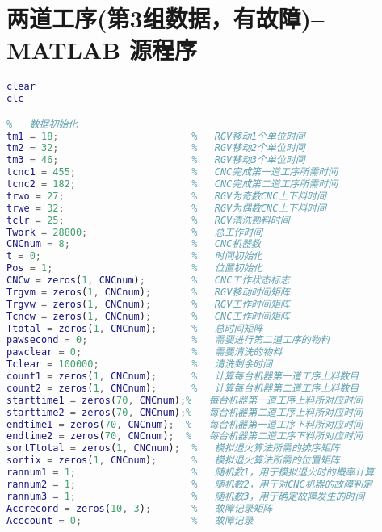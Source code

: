 \documentclass[no-math,withoutpreface,bwprint]{cumcmthesis} %
\numberwithin{equation}{section}
\numberwithin{figure}{section}
\numberwithin{table}{section}
\begin{document}
\section{ 两道工序(第3组数据，有故障)--MATLAB 源程序}
\begin{lstlisting}[language=matlab]
%   MATLAB初始化
clear
clc

%   数据初始化
tm1 = 18;                       %   RGV移动1个单位时间
tm2 = 32;                       %   RGV移动2个单位时间
tm3 = 46;                       %   RGV移动3个单位时间
tcnc1 = 455;                    %   CNC完成第一道工序所需时间
tcnc2 = 182;                    %   CNC完成第二道工序所需时间
trwo = 27;                      %   RGV为奇数CNC上下料时间
trwe = 32;                      %   RGV为偶数CNC上下料时间
tclr = 25;                      %   RGV清洗熟料时间
Twork = 28800;                  %   总工作时间
CNCnum = 8;                     %   CNC机器数
t = 0;                          %   时间初始化
Pos = 1;                        %   位置初始化
CNCw = zeros(1, CNCnum);        %   CNC工作状态标志
Trgvm = zeros(1, CNCnum);      	%   RGV移动时间矩阵
Trgvw = zeros(1, CNCnum);       %   RGV工作时间矩阵
Tcncw = zeros(1, CNCnum);       %   CNC工作时间矩阵
Ttotal = zeros(1, CNCnum);      %   总时间矩阵
pawsecond = 0;                  %   需要进行第二道工序的物料
pawclear = 0;                   %   需要清洗的物料
Tclear = 100000;                %   清洗剩余时间
count1 = zeros(1, CNCnum);      %   计算每台机器第一道工序上料数目
count2 = zeros(1, CNCnum);      %   计算每台机器第二道工序上料数目
starttime1 = zeros(70, CNCnum);%   每台机器第一道工序上料所对应时间
starttime2 = zeros(70, CNCnum);%   每台机器第二道工序上料所对应时间
endtime1 = zeros(70, CNCnum);  %   每台机器第一道工序下料所对应时间
endtime2 = zeros(70, CNCnum);  %   每台机器第二道工序下料所对应时间
sortTtotal = zeros(1, CNCnum);  %   模拟退火算法所需的排序矩阵
sortix = zeros(1, CNCnum);      %   模拟退火算法所需的位置矩阵
rannum1 = 1;                    %   随机数1，用于模拟退火时的概率计算
rannum2 = 1;                    %   随机数2，用于对CNC机器的故障判定
rannum3 = 1;                    %   随机数3，用于确定故障发生的时间
Accrecord = zeros(10, 3);       %   故障记录矩阵
Acccount = 0;                   %   故障记录


\end{lstlisting}
\end{document}

